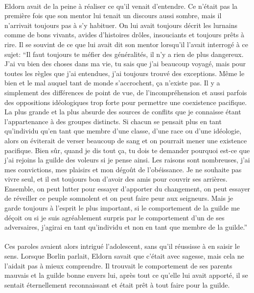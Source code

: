 \paragraph{}
Eldorn avait de la peine à réaliser ce qu'il venait d'entendre. Ce n'était pas
la première fois que son mentor lui tenait un discours aussi sombre, mais il
n'arrivait toujours pas à s'y habituer. On lui avait toujours décrit les
lurnains comme de bons vivants, avides d'histoires drôles, insouciants et
toujours prêts à rire. Il se souvint de ce que lui avait dit son mentor
lorsqu'il l'avait interrogé à ce sujet: ``Il faut toujours te méfier des
généralités, il n'y a rien de plus dangereux. J'ai vu bien des choses dans ma
vie, tu sais que j'ai beaucoup voyagé, mais pour toutes les règles que j'ai
entendues, j'ai toujours trouvé des exceptions. Même le bien et le mal auquel
tant de monde s'accrochent, ça n'existe pas. Il y a simplement des différences
de point de vue, de l'incompréhension et aussi parfois des oppositions
idéologiques trop forte pour permettre une coexistence pacifique. La plus
grande et la plus absurde des sources de conflits que je connaisse étant
l'appartenance à des groupes distincts. Si chacun se pensait plus en tant
qu'individu qu'en tant que membre d'une classe, d'une race ou d'une idéologie,
alors on éviterait de verser beaucoup de sang et on pourrait mener une
existence pacifique. Bien sûr, quand je dis tout ça, tu dois te demander
pourquoi est-ce que j'ai rejoins la guilde des voleurs si je pense ainsi. Les
raisons sont nombreuses, j'ai mes convictions, mes plaisirs et mon dégoût de
l'obéissance. Je ne souhaite pas vivre seul, et il est toujours bon d'avoir
des amis pour couvrir ses arrières. Ensemble, on peut lutter pour essayer
d'apporter du changement, on peut essayer de réveiller ce peuple somnolent et
on peut faire peur aux seigneurs. Mais je garde toujours à l'esprit le plus
important, si le comportement de la guilde me déçoit ou si je suis
agréablement surpris par le comportement d'un de ses adversaires, j'agirai en
tant qu'individu et non en tant que membre de la guilde.''

\paragraph{}
Ces paroles avaient alors intrigué l'adolescent, sans qu'il réussisse à en
saisir le sens. Lorsque Borlin parlait, Eldorn savait que c'était avec
sagesse, mais cela ne l'aidait pas à mieux comprendre. Il trouvait le
comportement de ses parents mauvais et la guilde bonne envers lui, après tout
ce qu'elle lui avait apporté, il se sentait éternellement reconnaissant et
était prêt à tout faire pour la guilde.

